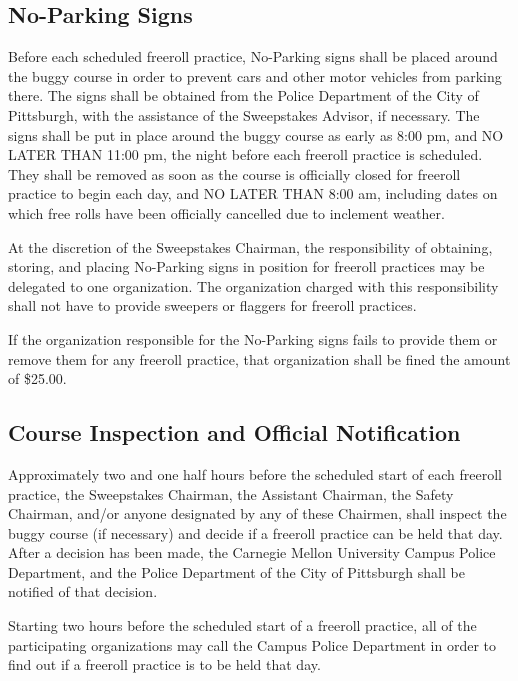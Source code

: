 \subsection{No-Parking Signs}

	Before each scheduled freeroll practice, No-Parking signs shall be placed
	around the buggy course in order to prevent cars and other motor vehicles from
	parking there. The signs shall be obtained from the Police Department of the
	City of Pittsburgh, with the assistance of the Sweepstakes Advisor, if
	necessary. The signs shall be put in place around the buggy course as early as
	8:00 pm, and NO LATER THAN 11:00 pm, the night before each freeroll practice is
	scheduled. They shall be removed as soon as the course is officially closed for
	freeroll practice to begin each day, and NO LATER THAN 8:00 am, including dates
	on which free rolls have been officially cancelled due to inclement weather.

	At the discretion of the Sweepstakes Chairman, the responsibility of obtaining,
	storing, and placing No-Parking signs in position for freeroll practices may be
	delegated to one organization. The organization charged with this
	responsibility shall not have to provide sweepers or flaggers for freeroll
	practices.

	If the organization responsible for the No-Parking signs fails to provide them
	or remove them for any freeroll practice, that organization shall be fined the
	amount of \$25.00.

\subsection{Course Inspection and Official Notification}

	Approximately two and one half hours before the scheduled start of each
	freeroll practice, the Sweepstakes Chairman, the Assistant Chairman, the Safety
	Chairman, and/or anyone designated by any of these Chairmen, shall inspect the
	buggy course (if necessary) and decide if a freeroll practice can be held that
	day. After a decision has been made, the Carnegie Mellon University Campus
	Police Department, and the Police Department of the City of Pittsburgh shall be
	notified of that decision.

	Starting two hours before the scheduled start of a freeroll practice, all of
	the participating organizations may call the Campus Police Department in order
	to find out if a freeroll practice is to be held that day.

